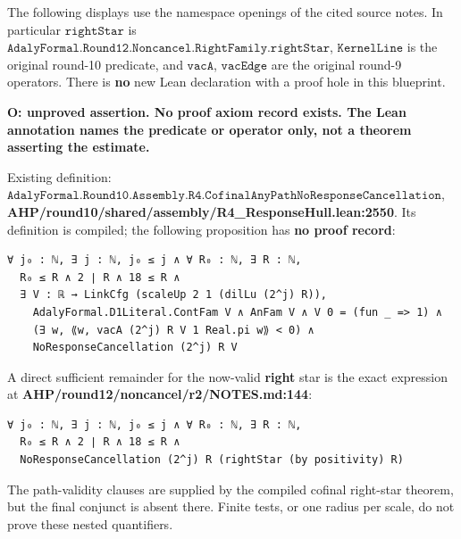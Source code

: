 The following displays use the namespace openings of the cited source notes. In particular \(\texttt{rightStar}\) is \(\texttt{AdalyFormal.Round12.Noncancel.RightFamily.rightStar}\), \(\texttt{KernelLine}\) is the original round-10 predicate, and \(\texttt{vacA}\), \(\texttt{vacEdge}\) are the original round-9 operators. There is \textbf{no} new Lean declaration with a proof hole in this blueprint.



\begin{theorem}
\label{open-cofinal}
\textbf{O: unproved assertion. No proof axiom record exists. The Lean annotation names the predicate or operator only, not a theorem asserting the estimate.}

Existing definition: \(\texttt{AdalyFormal.Round10.Assembly.R4.CofinalAnyPathNoResponseCancellation}\), \textbf{AHP/round10/shared/assembly/R4\_ResponseHull.lean:2550}. Its definition is compiled; the following proposition has \textbf{no proof record}:



\begin{verbatim}
∀ j₀ : ℕ, ∃ j : ℕ, j₀ ≤ j ∧ ∀ R₀ : ℕ, ∃ R : ℕ,
  R₀ ≤ R ∧ 2 ∣ R ∧ 18 ≤ R ∧
  ∃ V : ℝ → LinkCfg (scaleUp 2 1 (dilLu (2^j) R)),
    AdalyFormal.D1Literal.ContFam V ∧ AnFam V ∧ V 0 = (fun _ => 1) ∧
    (∃ w, ⟪w, vacA (2^j) R V 1 Real.pi w⟫ < 0) ∧
    NoResponseCancellation (2^j) R V
\end{verbatim}


A direct sufficient remainder for the now-valid \textbf{right} star is the exact expression at \textbf{AHP/round12/noncancel/r2/NOTES.md:144}:



\begin{verbatim}
∀ j₀ : ℕ, ∃ j : ℕ, j₀ ≤ j ∧ ∀ R₀ : ℕ, ∃ R : ℕ,
  R₀ ≤ R ∧ 2 ∣ R ∧ 18 ≤ R ∧
  NoResponseCancellation (2^j) R (rightStar (by positivity) R)
\end{verbatim}


The path-validity clauses are supplied by the compiled cofinal right-star theorem, but the final conjunct is absent there. Finite tests, or one radius per scale, do not prove these nested quantifiers.


\end{theorem}


